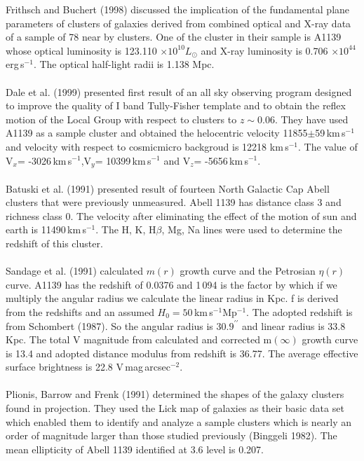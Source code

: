 Frithsch and Buchert (1998) discussed the implication of the fundamental plane parameters of clusters of galaxies derived from combined optical and X-ray data of a sample of 78  near by clusters. One of the cluster in their sample is A1139 whose optical luminosity is 123.110 $\times 10^{10}L_{\odot}$ and X-ray luminosity is 0.706 $\times 10^{44}$\,erg\,s$^{-1}$. The optical half-light radii is 1.138 Mpc.\\\\
Dale et al. (1999) presented first result of an all sky observing program designed to improve the quality of I band Tully-Fisher template and to obtain the reflex motion of the Local Group with respect to clusters to $z\sim 0.06$. They have used A1139 as a sample cluster and obtained the helocentric velocity 11855$\pm$59\,km\,s$^{-1}$ and velocity with respect to cosmicmicro backgroud is 12218 km\,s$^{-1}$. The value of V$_x$= -3026\,km\,s$^{-1}$,V$_y$= 10399\,km\,s$^{-1}$ and V$_z$= -5656\,km\,s$^{-1}$. \\\\
Batuski et al. (1991) presented result of fourteen North Galactic Cap Abell clusters that were previously unmeasured. Abell 1139 has distance class 3 and richness class 0. The velocity after eliminating the effect of the motion  of sun and earth is 11490\,km\,s$^{-1}$. The H, K, H$\beta$, Mg, Na lines were used to determine the redshift of this cluster.\\\\
Sandage et al. (1991) calculated $m(r)$ growth curve and the Petrosian $\eta(r)$ curve. A1139 has the redshift of 0.0376 and 1\,094 is the factor by which if we multiply the angular radius we calculate the linear radius in Kpc. f is derived from the redshifts and an assumed $H_0=50$\,km\,s$^{-1}$Mp$^{-1}$. The adopted redshift is from Schombert (1987). So the angular radius is $30.9^{\prime\prime}$ and linear radius is 33.8 Kpc. The total V magnitude from calculated and corrected m$(\infty)$ growth curve is 13.4 and adopted distance modulus from redshift is 36.77. The average effective surface brightness is 22.8 V\,mag\,arcsec$^{-2}$.\\\\
Plionis, Barrow and Frenk (1991) determined the shapes of the galaxy clusters found in projection. They used the Lick map of galaxies as their basic data set which enabled them to identify and analyze a sample clusters which is nearly an order of magnitude larger than those studied previously (Binggeli 1982). The mean ellipticity of Abell 1139 identified at 3.6 level is 0.207.\\\\
